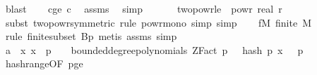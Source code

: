\begin{isabellebody}
\ blast\isanewline
\isanewline
\ \ \isamarkupfalse%
\ c{\isacharunderscore}{\kern0pt}ge{\isacharunderscore}{\kern0pt}{}{\isacharcolon}{\kern0pt}\ {\isachardoublequoteopen}c{\isasymge}{}{\isachardoublequoteclose}\ \isamarkupfalse%
\ assms\ \isamarkupfalse%
\ simp\isanewline
\ \ \isanewline
\ \ \isamarkupfalse%
\ two{\isacharunderscore}{\kern0pt}pow{\isacharunderscore}{\kern0pt}r{\isacharunderscore}{\kern0pt}le{\isacharunderscore}{\kern0pt}{}{\isacharcolon}{\kern0pt}\ {\isachardoublequoteopen}{}\ powr\ {\isacharparenleft}{\kern0pt}{\isacharminus}{\kern0pt}real\ r{\isacharparenright}{\kern0pt}\ {\isasymle}\ {}{\isachardoublequoteclose}\ \isanewline
\ \ \ \ \isamarkupfalse%
\ {\isacharparenleft}{\kern0pt}subst\ two{\isacharunderscore}{\kern0pt}powr{\isacharunderscore}{\kern0pt}{}{\isacharbrackleft}{\kern0pt}symmetric{\isacharbrackright}{\kern0pt}{\isacharcomma}{\kern0pt}\ rule\ powr{\isacharunderscore}{\kern0pt}mono{\isacharcomma}{\kern0pt}\ simp{\isacharcomma}{\kern0pt}\ simp{\isacharparenright}{\kern0pt}\isanewline
\isanewline
\ \ \isamarkupfalse%
\ f{\isacharunderscore}{\kern0pt}M{\isacharcolon}{\kern0pt}\ {\isachardoublequoteopen}finite\ M{\isachardoublequoteclose}\isanewline
\ \ \ \ \isamarkupfalse%
\ {\isacharparenleft}{\kern0pt}rule\ finite{\isacharunderscore}{\kern0pt}subset{\isacharbrackleft}{\kern0pt}\ B{\isacharequal}{\kern0pt}{\isachardoublequoteopen}{\isacharbraceleft}{\kern0pt}{}{\isachardot}{\kern0pt}{\isachardot}{\kern0pt}{\isacharless}{\kern0pt}p{\isacharbraceright}{\kern0pt}{\isachardoublequoteclose}{\isacharbrackright}{\kern0pt}{\isacharcomma}{\kern0pt}\ metis\ assms{\isacharparenleft}{\kern0pt}{}{\isacharparenright}{\kern0pt}{\isacharcomma}{\kern0pt}\ simp{\isacharparenright}{\kern0pt}\isanewline
\isanewline
\ \ \isamarkupfalse%
\ a{}{\isacharcolon}{\kern0pt}\ {\isachardoublequoteopen}{\isasymAnd}{\isasymomega}\ x{\isachardot}{\kern0pt}\ x\ {\isacharless}{\kern0pt}\ p\ {\isasymLongrightarrow}\ {\isasymomega}\ {\isasymin}\ bounded{\isacharunderscore}{\kern0pt}degree{\isacharunderscore}{\kern0pt}polynomials\ {\isacharparenleft}{\kern0pt}ZFact\ p{\isacharparenright}{\kern0pt}\ {}\ {\isasymLongrightarrow}\ hash\ p\ x\ {\isasymomega}\ {\isacharless}{\kern0pt}\ p{\isachardoublequoteclose}\ \isanewline
\ \ \ \ \isamarkupfalse%
\ hash{\isacharunderscore}{\kern0pt}range{\isacharbrackleft}{\kern0pt}OF\ p{\isacharunderscore}{\kern0pt}ge{\isacharunderscore}{\kern0pt}{}{\isacharbrackright}{\kern0pt}\ \isamarkupfalse%

\end{isabellebody}
